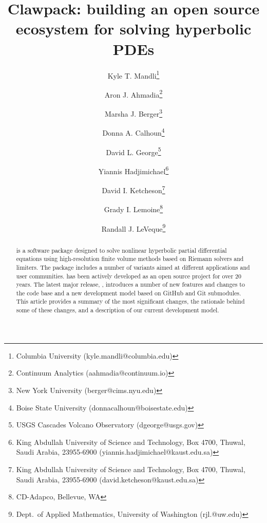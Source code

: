 \documentclass[]{article}
\begin{document}
\ifpdf
{}
\else
{}
\fi

\title{Clawpack: building an open source ecosystem for solving hyperbolic PDEs}


\author{
        Kyle T. Mandli\thanks{
            Columbia University (\mbox{kyle.mandli@columbia.edu})} \and
        Aron J. Ahmadia\thanks{
            Continuum Analytics (\mbox{aahmadia@continuum.io})} \and
        Marsha J. Berger\thanks{
            New York University (\mbox{berger@cims.nyu.edu})} \and
        Donna A. Calhoun\thanks{
            Boise State University (\mbox{donnacalhoun@boisestate.edu})} \and
        David L. George\thanks{
            USGS Cascades Volcano Observatory (\mbox{dgeorge@usgs.gov})} \and
        Yiannis Hadjimichael\thanks{
            King Abdullah University of Science and Technology, Box 4700, Thuwal, Saudi Arabia, 23955-6900 (\mbox{yiannis.hadjimichael@kaust.edu.sa})} \and
        David I. Ketcheson\thanks{
            King Abdullah University of Science and Technology, Box 4700, Thuwal, Saudi Arabia, 23955-6900 (\mbox{david.ketcheson@kaust.edu.sa})} \and
        Grady I. Lemoine\thanks{
            CD-Adapco, Bellevue, WA} \and
        Randall J. LeVeque\thanks{
            Dept.\ of Applied Mathematics, University of Washington (\mbox{rjl.@uw.edu})}
        }

\maketitle
\linenumbers
\begin{abstract}
    \clawpack is a software package designed to solve nonlinear
hyperbolic partial differential equations using high-resolution finite volume
methods based on Riemann solvers and limiters. The package includes a number
of variants aimed at different applications and user communities.
\clawpack has been actively developed as an open source project
for over 20 years.  The latest major release, , introduces
a number of new features and changes to the code base and a new
development model based on GitHub and Git submodules.  
This article provides a summary of the most significant changes,
the rationale behind some of these changes, and a description of our current
development model.
\end{abstract}









% 



\end{document}
